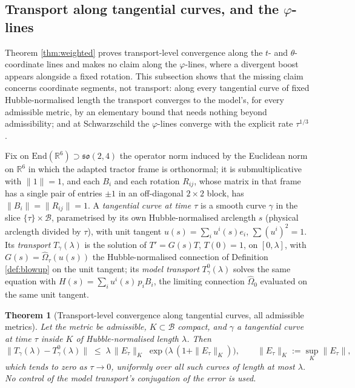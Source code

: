 \documentclass[11pt]{article}
\newtheorem{theorem}{Theorem}[section]
\theoremstyle{definition}
\newcommand{\R}{\mathbb{R}}
\begin{document}
\subsection{Transport along tangential curves, and the $\varphi$-lines}\label{subsec:tangential}

Theorem \ref{thm:weighted} proves transport-level convergence along the $t$- and $\theta$-coordinate lines and makes no claim along the $\varphi$-lines, where a divergent boost appears alongside a fixed rotation. This subsection shows that the missing claim concerns coordinate segments, not transport: along every tangential curve of fixed Hubble-normalised length the transport converges to the model's, for every admissible metric, by an elementary bound that needs nothing beyond admissibility; and at Schwarzschild the $\varphi$-lines converge with the explicit rate $\tau^{1/3}$.

Fix on $\mathrm{End}(\R^{6}) \supset \mathfrak{so}(2,4)$ the operator norm induced by the Euclidean norm on $\R^{6}$ in which the adapted tractor frame is orthonormal; it is submultiplicative with $\|1\| = 1$, and each $B_i$ and each rotation $R_{ij}$, whose matrix in that frame has a single pair of entries $\pm 1$ in an off-diagonal $2 \times 2$ block, has $\|B_i\| = \|R_{ij}\| = 1$. A \emph{tangential curve at time $\tau$} is a smooth curve $\gamma$ in the slice $\{\tau\} \times \mathcal{B}$, parametrised by its own Hubble-normalised arclength $s$ (physical arclength divided by $\tau$), with unit tangent $u(s) = \sum_{i} u^{i}(s) e_{i}$, $\sum (u^{i})^{2} = 1$. Its \emph{transport} $T_{\gamma}(\lambda)$ is the solution of $T' = G(s) T$, $T(0) = 1$, on $[0, \lambda]$, with $G(s) = \widehat\Omega_{\tau}(u(s))$ the Hubble-normalised connection of Definition \ref{def:blowup} on the unit tangent; its \emph{model transport} $T^{0}_{\gamma}(\lambda)$ solves the same equation with $H(s) = \sum_{i} u^{i}(s)\, p_{i} B_{i}$, the limiting connection $\widehat\Omega_0$ evaluated on the same unit tangent.

\begin{theorem}[Transport-level convergence along tangential curves, all admissible metrics]\label{thm:duhamel}
Let the metric be admissible, $K \subset \mathcal{B}$ compact, and $\gamma$ a tangential curve at time $\tau$ inside $K$ of Hubble-normalised length $\lambda$. Then
\[
\|T_{\gamma}(\lambda) - T^{0}_{\gamma}(\lambda)\| \;\le\; \lambda\, \|E_{\tau}\|_{K}\; \exp\bigl(\lambda\,(1 + \|E_{\tau}\|_{K})\bigr),
\qquad \|E_{\tau}\|_{K} := \sup_{K}\|E_{\tau}\| ,
\]
which tends to zero as $\tau \to 0$, uniformly over all such curves of length at most $\lambda$. No control of the model transport's conjugation of the error is used.
\end{theorem}
\end{document}
